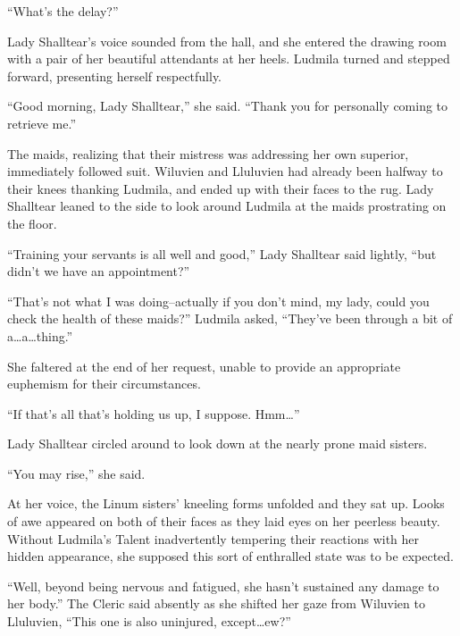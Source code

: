  

“What’s the delay?”

 

Lady Shalltear’s voice sounded from the hall, and she entered the drawing room with a pair of her beautiful attendants at her heels. Ludmila turned and stepped forward, presenting herself respectfully.

 

“Good morning, Lady Shalltear,” she said. “Thank you for personally coming to retrieve me.”

 

The maids, realizing that their mistress was addressing her own superior, immediately followed suit. Wiluvien and Lluluvien had already been halfway to their knees thanking Ludmila, and ended up with their faces to the rug. Lady Shalltear leaned to the side to look around Ludmila at the maids prostrating on the floor.

 

“Training your servants is all well and good,” Lady Shalltear said lightly, “but didn’t we have an appointment?”

 

“That’s not what I was doing–actually if you don’t mind, my lady, could you check the health of these maids?” Ludmila asked, “They’ve been through a bit of a…a…thing.”

 

She faltered at the end of her request, unable to provide an appropriate euphemism for their circumstances.

 

“If that’s all that’s holding us up, I suppose. Hmm…”

 

Lady Shalltear circled around to look down at the nearly prone maid sisters.

 

“You may rise,” she said.

 

At her voice, the Linum sisters’ kneeling forms unfolded and they sat up. Looks of awe appeared on both of their faces as they laid eyes on her peerless beauty. Without Ludmila’s Talent inadvertently tempering their reactions with her hidden appearance, she supposed this sort of enthralled state was to be expected.

 

“Well, beyond being nervous and fatigued, she hasn’t sustained any damage to her body.” The Cleric said absently as she shifted her gaze from Wiluvien to Lluluvien, “This one is also uninjured, except…ew?”

